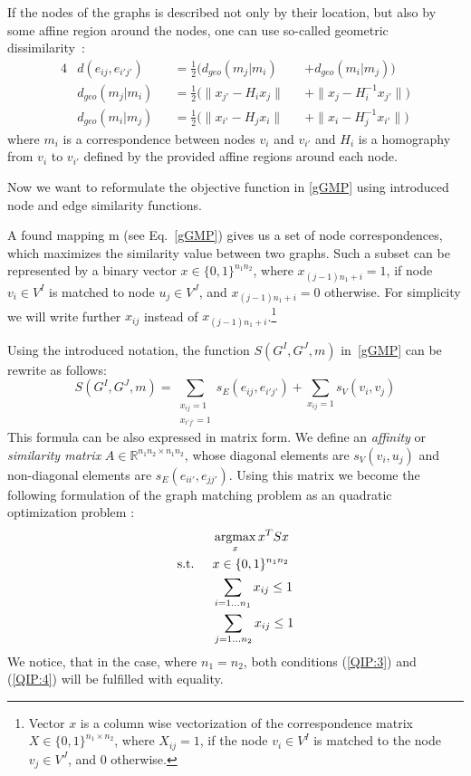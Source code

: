 \begin{itemize}
	If the nodes of the graphs is described not only by their location, but also by some affine region around the nodes, one can use so-called geometric dissimilarity~\cite{Cho2009_AgglClustering,Cho2012_ProgressiveGM}:
	\begin{alignat}{4}
	& d(e_{ij},e_{i'j'}) && =\frac{1}{2}(d_{geo}(m_j|m_i) && +d_{geo}(m_i|m_j)) \\
	& d_{geo}(m_j|m_i) && =\frac{1}{2}(\|x_{j'}-H_{i}x_j\| && + \|x_{j}-H^{-1}_ix_{j'}\|) \\
	& d_{geo}(m_i|m_j) && =\frac{1}{2}(\|x_{i'}-H_{j}x_i\| && + \|x_{i}-H^{-1}_{j}x_{i'}\|) 
	\end{alignat}
	where $m_i$ is a correspondence between nodes $v_i$ and $v_{i'}$ and $H_i$ is a homography from $v_i$ to $v_{i'}$ defined by the provided affine regions around each node.
\end{itemize}
\vspace{-5pt}
Now we want to reformulate the objective function in \eqref{gGMP} using introduced node and edge similarity functions.

A found mapping m (see Eq.~\eqref{gGMP}) gives us a set of node correspondences, which maximizes the similarity value between two graphs. Such a subset can be represented by a binary vector $x\in \{0,1\}^{n_1n_2}$, where $x_{(j-1)n_1+i}=1$, if node $v_i\in V^I$ is matched to node $u_j\in V^J$, and $x_{(j-1)n_1+i}=0$ otherwise. For simplicity we will write further $x_{ij}$ instead of $x_{(j-1)n_1+i}$.\footnote{Vector $x$ is a column wise vectorization of the correspondence matrix $X\in\{0,1\}^{n_1\times n_2}$, where $X_{ij}=1$, if the node $v_i\in V^I$ is matched to the node $v_j\in V^J$, and $0$ otherwise.}

Using the introduced notation, the function $S(G^I,G^J,m)$ in~\eqref{gGMP} can be rewrite as follows:
\begin{equation}
	S(G^I,G^J,m)=\sum_{\substack{x_{ij}=1\\x_{i'j'}=1}}s_E(e_{ij},e_{i'j'}) + \sum_{x_{ij}=1}s_V(v_{i},v_{j})
\end{equation}
This formula can be also expressed in matrix form. We define an \emph{affinity} or \emph{similarity matrix} $A\in\mathbb{R}^{n_1n_2\times n_1n_2}$, whose diagonal elements are $s_V(v_i, u_j)$ and non-diagonal elements are $s_E(e_{ii\prime}, e_{jj\prime})$. Using this matrix we become the following formulation of the graph matching problem as an quadratic optimization problem \cite{Cho2014_Haystack, Cho2010_RRWM, Cho2012_ProgressiveGM, Conte2004}:
\begin{alignat}{2}
    &     && \argmax_x{x^TSx}                           \label{QIP:1}\\ %
    & \text{s.t. } &&  x\in \{0,1\}^{n_1n_2}            \label{QIP:2}\\
    &             &&  \sum_{i=1\dots n_1} x_{ij}\le 1    \label{QIP:3}\\
    &             &&  \sum_{j=1\dots n_2} x_{ij}\le 1    \label{QIP:4}
\end{alignat}
We notice, that in the case, where $n_1=n_2$, both conditions (\ref{QIP:3}) and (\ref{QIP:4}) will be fulfilled with equality.

